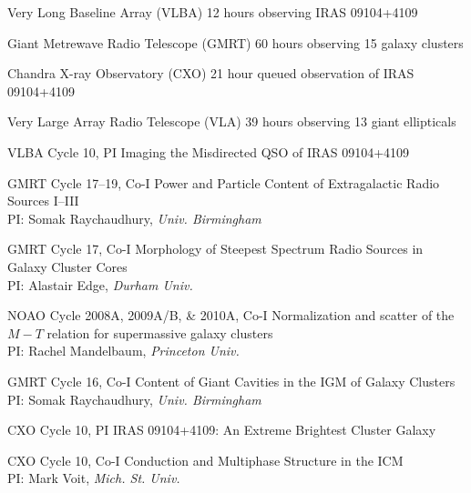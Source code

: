 \documentclass[11pt]{cv}
\begin{document}
\begin{llist}


Very Long Baseline Array (VLBA)
12 hours observing IRAS 09104+4109

Giant Metrewave Radio Telescope (GMRT)
60 hours observing 15 galaxy clusters

Chandra X-ray Observatory (CXO)
21 hour queued observation of IRAS 09104+4109

Very Large Array Radio Telescope (VLA)
39 hours observing 13 giant ellipticals



VLBA Cycle 10, PI
Imaging the Misdirected QSO of IRAS 09104+4109%

GMRT Cycle 17--19, Co-I
Power and Particle Content of Extragalactic Radio Sources I--III\\%
PI: Somak Raychaudhury, {\textit{Univ. Birmingham}}

GMRT Cycle 17, Co-I
Morphology of Steepest Spectrum Radio Sources in Galaxy Cluster Cores\\%
PI: Alastair Edge, {\textit{Durham Univ.}}

NOAO Cycle 2008A, 2009A/B, \& 2010A, Co-I
Normalization and scatter of the $M-T$ relation for supermassive galaxy clusters\\
PI: Rachel Mandelbaum, {\textit{Princeton Univ.}}

GMRT Cycle 16, Co-I
Content of Giant Cavities in the IGM of Galaxy Clusters\\%
PI: Somak Raychaudhury, {\textit{Univ. Birmingham}}

CXO Cycle 10, PI
IRAS 09104+4109: An Extreme Brightest Cluster Galaxy%

CXO Cycle 10, Co-I
Conduction and Multiphase Structure in the ICM\\%
PI: Mark Voit, {\textit{Mich. St. Univ.}}


\end{llist}
\end{document}
